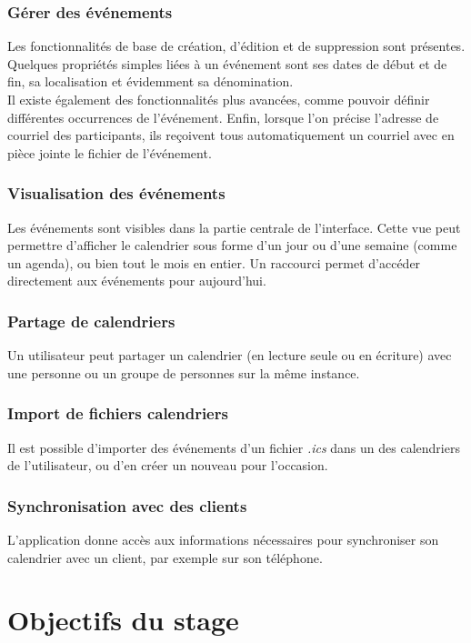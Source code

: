 \documentclass[10pt,a4paper, twoside]{report}
\begin{document}
	\subsubsection{Gérer des événements}
	Les fonctionnalités de base de création, d'édition et de suppression sont présentes. Quelques propriétés simples liées à un événement sont ses dates de début et de fin, sa localisation et évidemment sa dénomination.
	\\
	
	Il existe également des fonctionnalités plus avancées, comme pouvoir définir différentes occurrences de l'événement. Enfin, lorsque l'on précise l'adresse de courriel des participants, ils reçoivent tous automatiquement un courriel avec en pièce jointe le fichier de l'événement.
	
	\subsubsection{Visualisation des événements}
	Les événements sont visibles dans la partie centrale de l'interface. Cette vue peut permettre d'afficher le calendrier sous forme d'un jour ou d'une semaine (comme un agenda), ou bien tout le mois en entier. Un raccourci permet d'accéder directement aux événements pour aujourd’hui.
	
	\subsubsection{Partage de calendriers}
	Un utilisateur peut partager un calendrier (en lecture seule ou en écriture) avec une personne ou un groupe de personnes sur la même instance.
	
	\subsubsection{Import de fichiers calendriers}
	Il est possible d'importer des événements d'un fichier \textit{.ics} dans un des calendriers de l'utilisateur, ou d'en créer un nouveau pour l'occasion.
	
	\subsubsection{Synchronisation avec des clients}
	L'application donne accès aux informations nécessaires pour synchroniser son calendrier avec un client, par exemple sur son téléphone.
	
	\section{Objectifs du stage}
	
\end{document}
